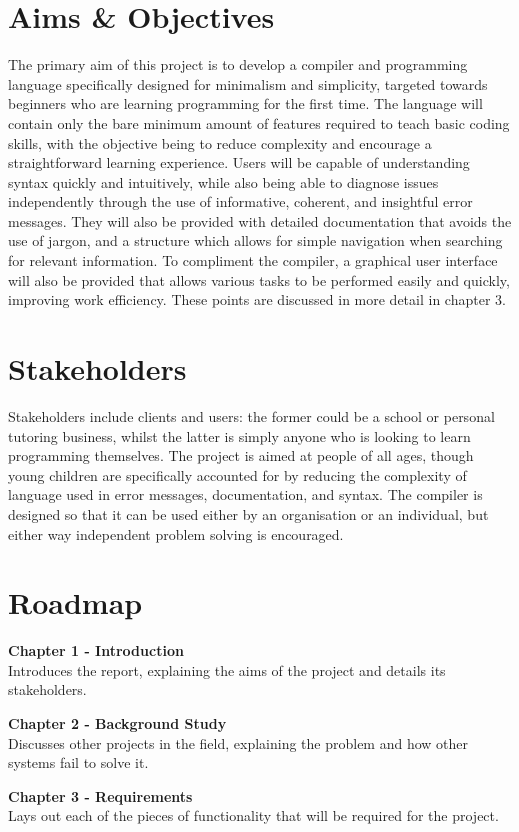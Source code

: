 \documentclass[
]{report}
\begin{document}
\section{Aims \& Objectives}
The primary aim of this project is to develop a compiler and programming
language specifically designed for minimalism and simplicity, targeted
towards beginners who are learning programming for the first time. The
language will contain only the bare minimum amount of features required
to teach basic coding skills, with the objective being to reduce
complexity and encourage a straightforward learning experience. Users
will be capable of understanding syntax quickly and intuitively, while
also being able to diagnose issues independently through the use of
informative, coherent, and insightful error messages. They will also be
provided with detailed documentation that avoids the use of jargon, and
a structure which allows for simple navigation when searching for
relevant information. To compliment the compiler, a graphical user
interface will also be provided that allows various tasks to be
performed easily and quickly, improving work efficiency. These points
are discussed in more detail in chapter 3.

\section{Stakeholders}
Stakeholders include clients and users: the former could be a school or
personal tutoring business, whilst the latter is simply anyone who is
looking to learn programming themselves. The project is aimed at people
of all ages, though young children are specifically accounted for by
reducing the complexity of language used in error messages,
documentation, and syntax. The compiler is designed so that it can be
used either by an organisation or an individual, but either way
independent problem solving is encouraged.

\section{Roadmap}
\textbf{Chapter 1 - Introduction}\\
Introduces the report, explaining the aims of the project and details
its stakeholders.

\textbf{Chapter 2 - Background Study}\\
Discusses other projects in the field, explaining the problem and how
other systems fail to solve it.

\textbf{Chapter 3 - Requirements}\\
Lays out each of the pieces of functionality that will be required for
the project.
\end{document}
